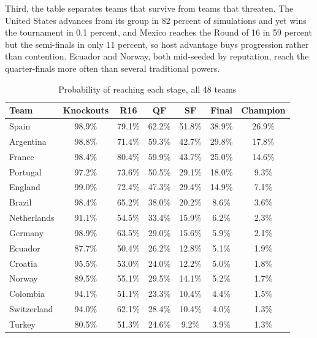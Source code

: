 \documentclass[11pt,letterpaper]{article}
\begin{document}
Third, the table separates teams that survive from teams that threaten. The United States advances from its group in 82 percent of simulations and yet wins the tournament in 0.1 percent, and Mexico reaches the Round of 16 in 59 percent but the semi-finals in only 11 percent, so host advantage buys progression rather than contention. Ecuador and Norway, both mid-seeded by reputation, reach the quarter-finals more often than several traditional powers.

\begin{table}[p]
  \centering
  \caption{Probability of reaching each stage, all 48 teams}\label{tab:survival}
  \begin{footnotesize}
  \begin{threeparttable}
    {\begin{tabular*}{\textwidth}{@{\extracolsep{\fill}} lcccccc}
      \toprule
      Team & Knockouts & R16 & QF & SF & Final & Champion \\
      \midrule
Spain                  & 98.9\% & 79.1\% & 62.2\% & 51.8\% & 38.9\% & 26.9\% \\
Argentina              & 98.8\% & 71.4\% & 59.3\% & 42.7\% & 29.8\% & 17.8\% \\
France                 & 98.4\% & 80.4\% & 59.9\% & 43.7\% & 25.0\% & 14.6\% \\
Portugal               & 97.2\% & 73.6\% & 50.5\% & 29.1\% & 18.0\% &  9.3\% \\
England                & 99.0\% & 72.4\% & 47.3\% & 29.4\% & 14.9\% &  7.1\% \\
Brazil                 & 98.4\% & 65.2\% & 38.0\% & 20.2\% &  8.6\% &  3.6\% \\
Netherlands            & 91.1\% & 54.5\% & 33.4\% & 15.9\% &  6.2\% &  2.3\% \\
Germany                & 98.9\% & 63.5\% & 29.0\% & 15.6\% &  5.9\% &  2.1\% \\
Ecuador                & 87.7\% & 50.4\% & 26.2\% & 12.8\% &  5.1\% &  1.9\% \\
Croatia                & 95.5\% & 53.0\% & 24.0\% & 12.2\% &  5.0\% &  1.8\% \\
Norway                 & 89.5\% & 55.1\% & 29.5\% & 14.1\% &  5.2\% &  1.7\% \\
Colombia               & 94.1\% & 51.1\% & 23.3\% & 10.4\% &  4.4\% &  1.5\% \\
Switzerland            & 94.0\% & 62.1\% & 28.4\% & 10.4\% &  4.0\% &  1.3\% \\
Turkey                 & 80.5\% & 51.3\% & 24.6\% &  9.2\% &  3.9\% &  1.3\% \\

\end{tabular*}}
\end{threeparttable}
\end{footnotesize}
\end{table}
\end{document}
